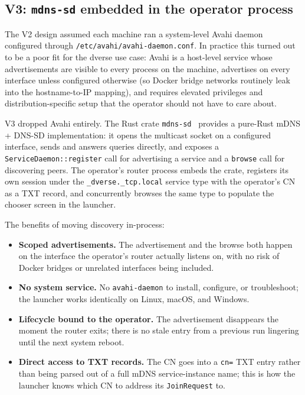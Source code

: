 \documentclass[11pt,a4paper]{article}
\begin{document}
\subsection{V3: \texttt{mdns-sd} embedded in the operator process}
\label{sec:mdns-mdnssd}

The V2 design assumed each machine ran a system-level Avahi daemon
configured through \texttt{/etc/avahi/avahi-daemon.conf}. In
practice this turned out to be a poor fit for the dverse use case:
Avahi is a host-level service whose advertisements are visible to
every process on the machine, advertises on every interface unless
configured otherwise (so Docker bridge networks routinely leak into
the hostname-to-IP mapping), and requires elevated privileges and
distribution-specific setup that the operator should not have to
care about.

V3 dropped Avahi entirely. The Rust crate
\texttt{mdns-sd}~\citep{mdnssd} provides a pure-Rust mDNS + DNS-SD
implementation: it opens the multicast socket on a configured
interface, sends and answers queries directly, and exposes a
\texttt{ServiceDaemon::register} call for advertising a service and
a \texttt{browse} call for discovering peers. The operator's router
process embeds the crate, registers its own session under the
\texttt{\_dverse.\_tcp.local} service type with the operator's CN as
a TXT record, and concurrently browses the same type to populate
the chooser screen in the launcher.

The benefits of moving discovery in-process:

\begin{itemize}[leftmargin=1.4em]
  \item \textbf{Scoped advertisements.} The advertisement and the
        browse both happen on the interface the operator's router
        actually listens on, with no risk of Docker bridges or
        unrelated interfaces being included.
  \item \textbf{No system service.} No \texttt{avahi-daemon} to
        install, configure, or troubleshoot; the launcher works
        identically on Linux, macOS, and Windows.
  \item \textbf{Lifecycle bound to the operator.} The
        advertisement disappears the moment the router exits;
        there is no stale entry from a previous run lingering until
        the next system reboot.
  \item \textbf{Direct access to TXT records.} The CN goes into a
        \texttt{cn=} TXT entry rather than being parsed out of a
        full mDNS service-instance name; this is how the launcher
        knows which CN to address its \texttt{JoinRequest} to.
\end{itemize}
\end{document}
